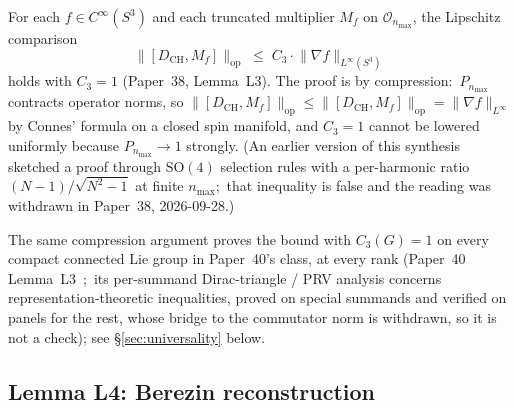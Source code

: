 \documentclass[11pt,a4paper]{article}
\theoremstyle{plain}
\theoremstyle{definition}
\newcommand{\nmax}{n_{\max}}
\newcommand{\sthree}{S^{3}}
\newcommand{\DCH}{D_{\mathrm{CH}}}
\newcommand{\Op}{\mathcal{O}}
\newcommand{\opnorm}[1]{\lVert #1 \rVert_{\mathrm{op}}}
\newcommand{\norm}[1]{\lVert #1 \rVert}
\newcommand{\SO}{\mathrm{SO}}
\newcommand{\Mat}{M}
\begin{document}
For each $f \in C^{\infty}(\sthree)$ and each truncated multiplier
$\Mat_{f}$ on $\Op_{\nmax}$, the Lipschitz comparison
\begin{equation}
\opnorm{[\DCH, \Mat_{f}]}
\;\le\;
C_{3} \cdot \norm{\nabla f}_{L^{\infty}(\sthree)}
\label{eq:lipschitz_bound}
\end{equation}
holds with $C_{3} = 1$ (Paper~38, Lemma~L3).  The proof is by
compression:\ $P_{\nmax}$ contracts operator norms, so
$\opnorm{[\DCH, \Mat_{f}]} \le \opnorm{[\DCH, M_{f}]} =
\norm{\nabla f}_{L^{\infty}}$ by Connes' formula on a closed spin
manifold, and $C_{3} = 1$ cannot be lowered uniformly because
$P_{\nmax} \to 1$ strongly.  (An earlier version of this synthesis
sketched a proof through $\SO(4)$ selection rules with a per-harmonic
ratio $(N-1)/\sqrt{N^{2}-1}$ at finite $\nmax$;\ that inequality is
false and the reading was withdrawn in Paper~38, 2026-09-28.)

The same compression argument proves the bound with $C_{3}(G) = 1$ on
every compact connected Lie group in Paper~40's class, at every rank
(Paper~40 Lemma~L3~\cite{paper40_unified};\ its per-summand
Dirac-triangle / PRV analysis concerns representation-theoretic
inequalities, proved on special summands and verified on panels for the
rest, whose bridge to the commutator norm is withdrawn, so it is not a
check); see
\S\ref{sec:universality} below.

\subsection{Lemma L4: Berezin reconstruction}
\end{document}
